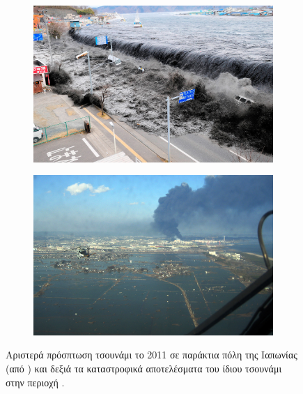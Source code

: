 \begin{figure}[h]
  \begin{subfigure}{.5\textwidth}
    \centering
    \includegraphics[width=\textwidth]{figures/tsunami-hit.jpg}
  \end{subfigure}
  \begin{subfigure}{.5\textwidth}
    \centering
    \includegraphics[width=\textwidth]{figures/tsunami-aftermath.jpg}
  \end{subfigure}
  \caption[Πρόσπτωση και καταστροφικά αποτελέσματα τσουνάμι]{Αριστερά πρόσπτωση τσουνάμι
    το 2011 σε παράκτια πόλη της Ιαπωνίας (από ) και δεξιά τα
    καταστροφικά αποτελέσματα του ίδιου τσουνάμι στην περιοχή .}
  \label{fig:tsunami-hit-aftermath}
\end{figure}

